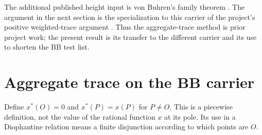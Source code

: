 \documentclass[11pt,a4paper]{article}
\begin{document}
The additional published height input is von Buhren's family theorem
\cite[Theorem 1.1, p.~308]{VB}. The argument in the next section is
the specialization to this carrier of the project's positive
weighted-trace argument \cite{Weighted}. Thus the aggregate-trace
method is prior project work; the present result is its transfer to
the different carrier and its use to shorten the BB test list.

\section{Aggregate trace on the BB carrier}
Define $x^*(O)=0$ and $x^*(P)=x(P)$ for $P\ne O$. This is a
piecewise definition, not the value of the rational function $x$ at
its pole. Its use in a Diophantine relation means a finite disjunction
according to which points are $O$.
\end{document}
